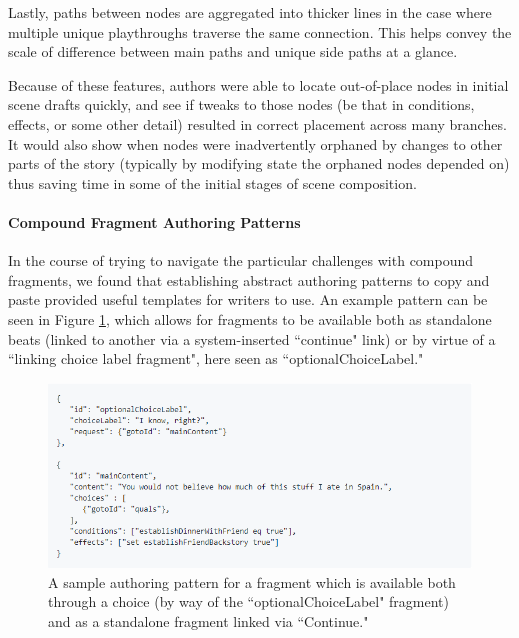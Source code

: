 Lastly, paths between nodes are aggregated into thicker lines in the case where multiple unique playthroughs traverse the same connection. This helps convey the scale of difference between main paths and unique side paths at a glance.

Because of these features, authors were able to locate out-of-place nodes in initial scene drafts quickly, and see if tweaks to those nodes (be that in conditions, effects, or some other detail) resulted in correct placement across many branches. It would also show when nodes were inadvertently orphaned by changes to other parts of the story (typically by modifying state the orphaned nodes depended on) thus saving time in some of the initial stages of scene composition.


\paragraph{Compound Fragment Authoring Patterns}

In the course of trying to navigate the particular challenges with compound fragments, we found that establishing abstract authoring patterns to copy and paste provided useful templates for writers to use. An example pattern can be seen in Figure \ref{fig:auth-pattern}, which allows for fragments to be available both as standalone beats (linked to another via a system-inserted ``continue" link) or by virtue of a ``linking choice label fragment", here seen as ``optionalChoiceLabel."


\begin{figure}
    \centering
    \includegraphics[width=\textwidth]{figures/3-StoryAssembler/data-object-1.png}
    \caption{A sample authoring pattern for a fragment which is available both through a choice (by way of the ``optionalChoiceLabel" fragment) and as a standalone fragment linked via ``Continue."}
    \label{fig:auth-pattern}
\end{figure}

